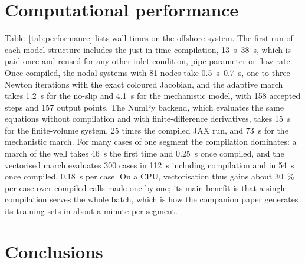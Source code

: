 \documentclass[a4paper,fleqn]{cas-sc}
\begin{document}
\section{Computational performance}\label{sec:performance}

Table~\ref{tab:performance} lists wall times on the offshore system. The first run of each model structure includes the just-in-time compilation, \SIrange{13}{38}{\second}, which is paid once and reused for any other inlet condition, pipe parameter or flow rate. Once compiled, the nodal systems with 81 nodes take \SIrange{0.5}{0.7}{\second}, one to three Newton iterations with the exact coloured Jacobian, and the adaptive march takes \SI{1.2}{\second} for the no-slip and \SI{4.1}{\second} for the mechanistic model, with 158 accepted steps and 157 output points. The NumPy backend, which evaluates the same equations without compilation and with finite-difference derivatives, takes \SI{15}{\second} for the finite-volume system, 25 times the compiled JAX run, and \SI{73}{\second} for the mechanistic march. For many cases of one segment the compilation dominates: a march of the well takes \SI{46}{\second} the first time and \SI{0.25}{\second} once compiled, and the vectorised march evaluates 300 cases in \SI{112}{\second} including compilation and in \SI{54}{\second} once compiled, \SI{0.18}{\second} per case. On a CPU, vectorisation thus gains about \SI{30}{\percent} per case over compiled calls made one by one; its main benefit is that a single compilation serves the whole batch, which is how the companion paper generates its training sets in about a minute per segment.

\begin{table}[htbp]
\caption{Wall times on the offshore system.}\label{tab:performance}
\footnotesize


\end{table}

\section{Conclusions}\label{sec:conclusions}
\end{document}
